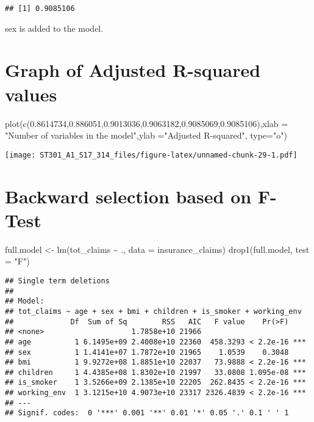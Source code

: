 \documentclass[
]{article}
\newenvironment{Shaded}{\begin{snugshade}}{\end{snugshade}}
\newcommand{\AttributeTok}[1]{\textcolor[rgb]{0.77,0.63,0.00}{#1}}
\newcommand{\FloatTok}[1]{\textcolor[rgb]{0.00,0.00,0.81}{#1}}
\newcommand{\FunctionTok}[1]{\textcolor[rgb]{0.00,0.00,0.00}{#1}}
\newcommand{\NormalTok}[1]{#1}
\newcommand{\OtherTok}[1]{\textcolor[rgb]{0.56,0.35,0.01}{#1}}
\newcommand{\SpecialCharTok}[1]{\textcolor[rgb]{0.00,0.00,0.00}{#1}}
\newcommand{\StringTok}[1]{\textcolor[rgb]{0.31,0.60,0.02}{#1}}
\begin{document}
\begin{verbatim}
## [1] 0.9085106
\end{verbatim}

sex is added to the model.

\hypertarget{graph-of-adjusted-r-squared-values}{%
\section{Graph of Adjusted R-squared
values}\label{graph-of-adjusted-r-squared-values}}

\begin{Shaded}
\begin{Highlighting}[]
\FunctionTok{plot}\NormalTok{(}\FunctionTok{c}\NormalTok{(}\FloatTok{0.8614734}\NormalTok{,}\FloatTok{0.886051}\NormalTok{,}\FloatTok{0.9013036}\NormalTok{,}\FloatTok{0.9063182}\NormalTok{,}\FloatTok{0.9085069}\NormalTok{,}\FloatTok{0.9085106}\NormalTok{),}\AttributeTok{xlab =} \StringTok{"Number of variables in the model"}\NormalTok{,}\AttributeTok{ylab =}\StringTok{"Adjusted R{-}squared"}\NormalTok{, }\AttributeTok{type=}\StringTok{"o"}\NormalTok{)}
\end{Highlighting}
\end{Shaded}

\texttt{[image: ST301\_A1\_S17\_314\_files/figure-latex/unnamed-chunk-29-1.pdf]}

\hypertarget{backward-selection-based-on-f-test}{%
\section{Backward selection based on
F-Test}\label{backward-selection-based-on-f-test}}

\begin{Shaded}
\begin{Highlighting}[]
\NormalTok{full.model }\OtherTok{\textless{}{-}} \FunctionTok{lm}\NormalTok{(tot\_claims }\SpecialCharTok{\textasciitilde{}}\NormalTok{ ., }\AttributeTok{data =}\NormalTok{ insurance\_claims)}
\FunctionTok{drop1}\NormalTok{(full.model, }\AttributeTok{test =} \StringTok{"F"}\NormalTok{)}
\end{Highlighting}
\end{Shaded}

\begin{verbatim}
## Single term deletions
## 
## Model:
## tot_claims ~ age + sex + bmi + children + is_smoker + working_env
##             Df  Sum of Sq        RSS   AIC   F value    Pr(>F)    
## <none>                    1.7858e+10 21966                        
## age          1 6.1495e+09 2.4008e+10 22360  458.3293 < 2.2e-16 ***
## sex          1 1.4141e+07 1.7872e+10 21965    1.0539    0.3048    
## bmi          1 9.9272e+08 1.8851e+10 22037   73.9888 < 2.2e-16 ***
## children     1 4.4385e+08 1.8302e+10 21997   33.0808 1.095e-08 ***
## is_smoker    1 3.5266e+09 2.1385e+10 22205  262.8435 < 2.2e-16 ***
## working_env  1 3.1215e+10 4.9073e+10 23317 2326.4839 < 2.2e-16 ***
## ---
## Signif. codes:  0 '***' 0.001 '**' 0.01 '*' 0.05 '.' 0.1 ' ' 1
\end{verbatim}
\end{document}
